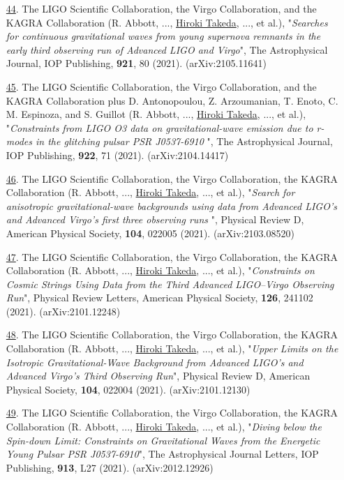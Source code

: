 \documentclass[uplatex, 12pt]{article}
\begin{document}
\begin{enumerate}
\item[\uline{44}.] The LIGO Scientific Collaboration, the Virgo Collaboration, and the KAGRA Collaboration (R. Abbott, ..., \uline{Hiroki Takeda}, ..., et al.), "\emph{Searches for continuous gravitational waves from young supernova remnants in the early third observing run of Advanced LIGO and Virgo}", The Astrophysical Journal, IOP Publishing, {\bf 921}, 80 (2021). (arXiv:2105.11641)\\

\item[\uline{45}.] The LIGO Scientific Collaboration, the Virgo Collaboration, and the KAGRA Collaboration plus D. Antonopoulou, Z. Arzoumanian, T. Enoto, C. M. Espinoza, and S. Guillot (R. Abbott, ..., \uline{Hiroki Takeda}, ..., et al.), "\emph{Constraints from LIGO O3 data on gravitational-wave emission due to r-modes in the glitching pulsar PSR J0537-6910 }", The Astrophysical Journal, IOP Publishing, {\bf 922}, 71 (2021). (arXiv:2104.14417)\\

\item[\uline{46}.] The LIGO Scientific Collaboration, the Virgo Collaboration, the KAGRA Collaboration (R. Abbott, ..., \uline{Hiroki Takeda}, ..., et al.), "\emph{Search for anisotropic gravitational-wave backgrounds using data from Advanced LIGO's and Advanced Virgo's first three observing runs }", Physical Review D, American Physical Society, {\bf 104}, 022005 (2021). (arXiv:2103.08520)\\

\item[\uline{47}.] The LIGO Scientific Collaboration, the Virgo Collaboration, the KAGRA Collaboration (R. Abbott, ..., \uline{Hiroki Takeda}, ..., et al.), "\emph{Constraints on Cosmic Strings Using Data from the Third Advanced LIGO–Virgo Observing Run}", Physical Review Letters, American Physical Society, {\bf 126}, 241102 (2021). (arXiv:2101.12248)\\

\item[\uline{48}.] The LIGO Scientific Collaboration, the Virgo Collaboration, the KAGRA Collaboration (R. Abbott, ..., \uline{Hiroki Takeda}, ..., et al.), "\emph{Upper Limits on the Isotropic Gravitational-Wave Background from Advanced LIGO's and Advanced Virgo's Third Observing Run}", Physical Review D, American Physical Society, {\bf 104}, 022004 (2021). (arXiv:2101.12130)\\

\item[\uline{49}.] The LIGO Scientific Collaboration, the Virgo Collaboration, the KAGRA Collaboration (R. Abbott, ..., \uline{Hiroki Takeda}, ..., et al.), "\emph{Diving below the Spin-down Limit: Constraints on Gravitational Waves from the Energetic Young Pulsar PSR J0537-6910}", The Astrophysical Journal Letters, IOP Publishing, {\bf 913}, L27 (2021). (arXiv:2012.12926)\\


\end{enumerate}
\end{document}
